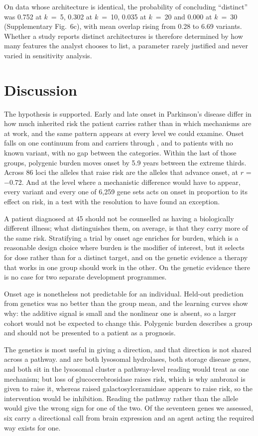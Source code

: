 \documentclass[10pt]{article}
\begin{document}
On data whose architecture is identical, the probability of concluding ``distinct'' was 0.752 at
$k$~=~5, 0.302 at $k$~=~10, 0.035 at $k$~=~20 and 0.000 at $k$~=~30 (Supplementary Fig.~6c), with mean overlap
rising from 0.28 to 6.69 variants. Whether a study reports distinct architectures is therefore
determined by how many features the analyst chooses to list, a parameter rarely justified and
never varied in sensitivity analysis.

\section*{Discussion}

The hypothesis is supported. Early and late onset in Parkinson's disease differ in how much inherited risk the patient carries rather than in which mechanisms are at work, and the same pattern appears at every level we could examine. Onset falls on one continuum from  and  carriers
through ,  and  to patients with no known variant, with no gap
between the categories. Within the last of those groups, polygenic burden moves onset by 5.9 years
between the extreme thirds. Across 86 loci the alleles that raise risk are the alleles that advance
onset, at $r$ = $-$0.72. And at the level where a mechanistic difference would have to appear, every variant and every one of 6,259 gene sets acts on onset in proportion to its effect on risk, in a test with the resolution to have found an exception.

A patient diagnosed at 45 should not be counselled as having a biologically different illness; what distinguishes them, on average, is that they carry more of the same risk. Stratifying a trial by onset age enriches for burden, which is a reasonable design choice where burden is the modifier of interest, but it selects for dose rather than for a distinct target, and on the genetic evidence a therapy that works in one group should work in the other.
On the genetic evidence there is no case for two separate development programmes.

Onset age is nonetheless not predictable for an individual. Held-out prediction from genetics was
no better than the group mean, and the learning curves show why: the additive signal is small and
the nonlinear one is absent, so a larger cohort would not be expected to change this.
Polygenic burden describes a group and should not be presented to a patient as a prognosis.

The genetics is most useful in giving a direction, and that direction is not shared across a pathway.  and  are both
lysosomal hydrolases, both storage disease genes, and both sit in the lysosomal cluster a
pathway-level reading would treat as one mechanism; but loss of glucocerebrosidase raises risk,
which is why ambroxol is given to raise it, whereas raised galactosylceramidase appears to raise
risk, so the intervention would be inhibition. Reading the pathway rather than the allele would give the wrong sign for one
of the two. Of the seventeen genes we assessed, six carry a directional call
from brain expression and an agent acting the required way exists for one.
\end{document}
